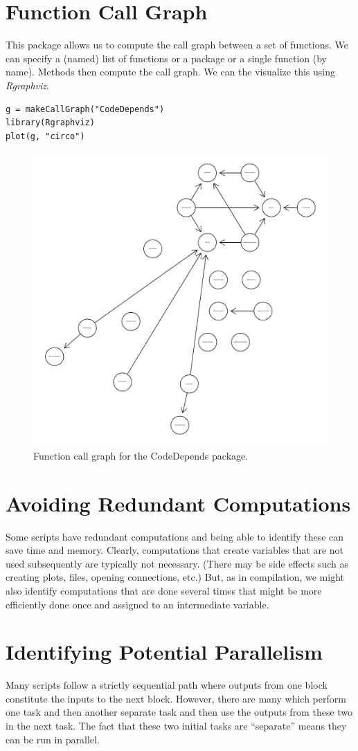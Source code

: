 \documentclass{article}
\def\Rpkg#1{\textsl{#1}}
\begin{document}
\section{Function Call Graph}
This package allows us to compute 
the call graph between a set of functions.
We can specify a (named) list of functions
or a package or a single function (by name).
Methods then compute the call graph.
We can the visualize this using
\Rpkg{Rgraphviz}.
\begin{verbatim}
g = makeCallGraph("CodeDepends")
library(Rgraphviz)
plot(g, "circo")
\end{verbatim}
\begin{figure}
  \centering
  \includegraphics{callGraph.pdf}
  \caption{Function call graph for the CodeDepends package.}
\end{figure}


\section{Avoiding Redundant Computations}
Some scripts have redundant computations and being able to identify
these can save time and memory.  Clearly, computations that create
variables that are not used subsequently are typically not necessary.
(There may be side effects such as creating plots, files, opening
connections, etc.)  But, as in compilation, we might also identify
computations that are done several times that might be more
efficiently done once and assigned to an intermediate variable.

\section{Identifying Potential Parallelism}
Many scripts follow a strictly sequential path
where outputs from one block constitute the
inputs to the next block.
However, there are many which perform
one task and then another separate task and then
use the outputs from these two in the next task.
The fact that these two initial tasks are ``separate''
means they can be run in parallel.
\end{document}
